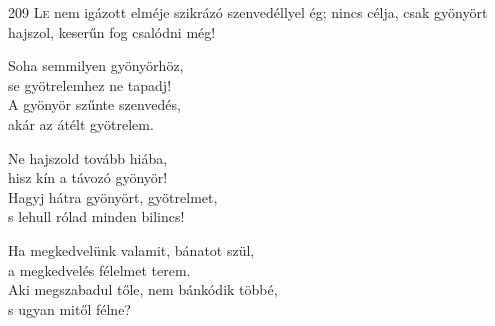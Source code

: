
\begin{firstdhpverse}{209}
\lettrine[slope=0.5em]{L}{e} {\LettrineTextFont nem igázott elméje}\newline
szikrázó szenvedéllyel ég;\newline
nincs célja, csak gyönyört hajszol,\newline
keserűn fog csalódni még!
\end{firstdhpverse}

\begin{dhpverse}

 Soha semmilyen gyönyörhöz,\\
se gyötrelemhez ne tapadj!\\
A gyönyör szűnte szenvedés,\\
akár az átélt gyötrelem.

 Ne hajszold tovább hiába,\\
hisz kín a távozó gyönyör!\\
Hagyj hátra gyönyört, gyötrelmet,\\
s lehull rólad minden bilincs!

 Ha megkedvelünk valamit, bánatot szül,\\
a megkedvelés félelmet terem.\\
Aki megszabadul tőle, nem bánkódik többé,\\
s ugyan mitől félne?

\end{dhpverse}
\newpage
